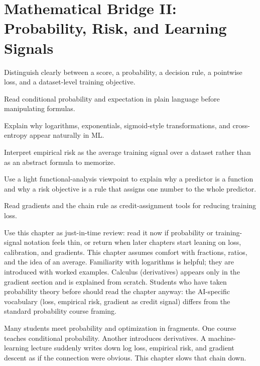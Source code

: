 \chapter*{Mathematical Bridge II: Probability, Risk, and Learning Signals}

\begin{learninggoals}
\item Distinguish clearly between a score, a probability, a decision rule, a pointwise loss, and a dataset-level training objective.
\item Read conditional probability and expectation in plain language before manipulating formulas.
\item Explain why logarithms, exponentials, sigmoid-style transformations, and cross-entropy appear naturally in ML.
\item Interpret empirical risk as the average training signal over a dataset rather than as an abstract formula to memorize.
\item Use a light functional-analysis viewpoint to explain why a predictor is a function and why a risk objective is a rule that assigns one number to the whole predictor.
\item Read gradients and the chain rule as credit-assignment tools for reducing training loss.
\end{learninggoals}

\begin{prereqbridge}
Use this chapter as just-in-time review: read it now if probability or training-signal notation feels thin, or return when later chapters start leaning on loss, calibration, and gradients. This chapter assumes comfort with fractions, ratios, and the idea of an average. Familiarity with logarithms is helpful; they are introduced with worked examples. Calculus (derivatives) appears only in the gradient section and is explained from scratch. Students who have taken probability theory before should read the chapter anyway: the AI-specific vocabulary (loss, empirical risk, gradient as credit signal) differs from the standard probability course framing.
\end{prereqbridge}

Many students meet probability and optimization in fragments. One course teaches conditional probability. Another introduces derivatives. A machine-learning lecture suddenly writes down log loss, empirical risk, and gradient descent as if the connection were obvious. This chapter slows that chain down.


